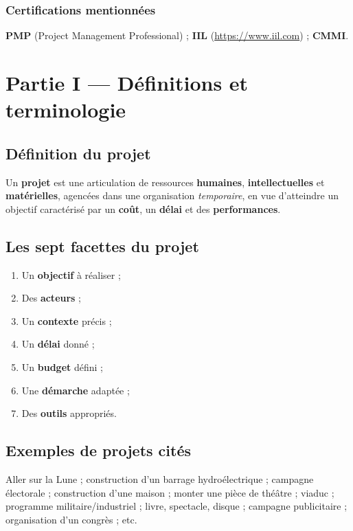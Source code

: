 \documentclass[11pt,a4paper]{article}
\begin{document}
\subsubsection{Certifications mentionnées}
\textbf{PMP} (Project Management Professional) ; \textbf{IIL} (\url{https://www.iil.com}) ; \textbf{CMMI}.

\section{Partie I — Définitions et terminologie}

\subsection{Définition du projet}
Un \textbf{projet} est une articulation de ressources \textbf{humaines}, \textbf{intellectuelles} et \textbf{matérielles}, agencées dans une organisation \emph{temporaire}, en vue d'atteindre un objectif caractérisé par un \textbf{coût}, un \textbf{délai} et des \textbf{performances}.

\subsection{Les sept facettes du projet}
\begin{enumerate}[nosep]
  \item Un \textbf{objectif} à réaliser ;
  \item Des \textbf{acteurs} ;
  \item Un \textbf{contexte} précis ;
  \item Un \textbf{délai} donné ;
  \item Un \textbf{budget} défini ;
  \item Une \textbf{démarche} adaptée ;
  \item Des \textbf{outils} appropriés.
\end{enumerate}

\subsection{Exemples de projets cités}
Aller sur la Lune ; construction d'un barrage hydroélectrique ; campagne électorale ; construction d'une maison ; monter une pièce de théâtre ; viaduc ; programme militaire/industriel ; livre, spectacle, disque ; campagne publicitaire ; organisation d'un congrès ; etc.
\end{document}
